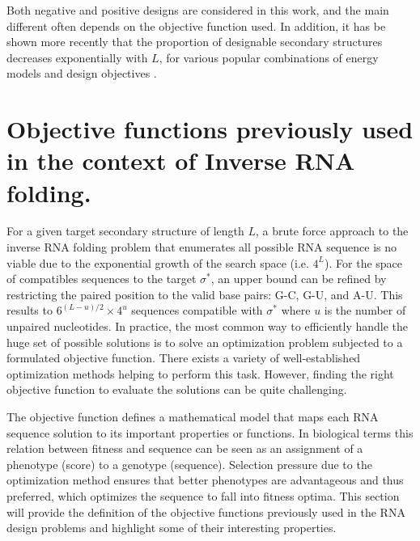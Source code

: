 Both negative and positive designs are considered in this work, and the main different often depends on the objective function used. In addition, it has be shown more recently that the proportion of designable secondary structures decreases exponentially with $L$, for various popular combinations of energy models and design objectives \cite{yao2019exponentially}.


\section{Objective functions previously used in the context of Inverse RNA folding.}

For a given target secondary structure of length $L$, a brute force approach to the inverse RNA folding problem that enumerates all possible RNA sequence is no viable due to the exponential growth of the search space (i.e. $4^L$). For the space of compatibles sequences to the target $\sigma^*$, an upper bound can be refined by restricting the paired position to the valid base pairs: G-C, G-U, and A-U. This results to $6^{(L-u)/2} \times 4^u$ sequences compatible with $\sigma^*$ where $u$ is the number of unpaired nucleotides. In practice, the most common way to efficiently handle the huge set of possible solutions is to solve an optimization problem subjected to a formulated objective function. There exists a variety of well-established optimization methods helping to perform this task. However, finding the right objective function to evaluate the solutions can be quite challenging. 

The objective function defines a mathematical model that maps each RNA sequence solution to its important properties or functions. In biological terms this relation between fitness and sequence can be seen as an assignment of a phenotype (score) to a genotype (sequence). Selection pressure due to the optimization method ensures that better phenotypes are advantageous and thus preferred, which optimizes the sequence to fall into fitness optima. This section will provide the definition of the objective functions previously used in the RNA design problems and highlight some of their interesting properties.

